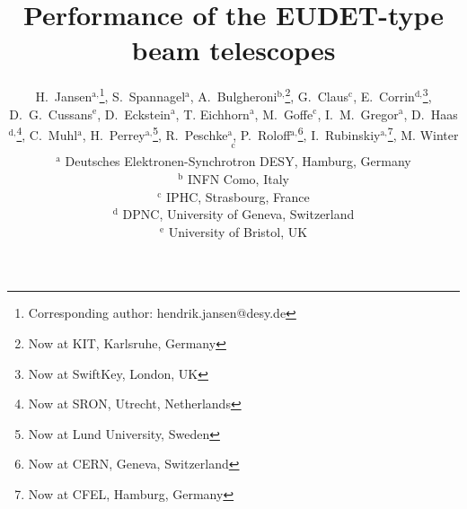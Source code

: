 \documentclass[a4paper,10pt]{article}
\makeatletter
\renewcommand{\maketitle}{\bgroup\setlength{\parindent}{0pt}
\begin{flushleft}
  \vspace*{10mm}
  \textbf{\huge\sffamily\@title}
  \vspace{5mm}
   
  \large \@author
\end{flushleft}\egroup
}
\makeatother
\begin{document}
\linenumbers








\title{Performance of the EUDET-type\\ beam telescopes}
\author{
H.~Jansen${}^{\textrm{a,}}$\footnote[*]{Corresponding author: hendrik.jansen@desy.de},
S.~Spannagel${}^{\textrm{a}}$, 
A.~Bulgheroni${}^{\textrm{b,}}$\footnote{Now at KIT, Karlsruhe, Germany},
G.~Claus${}^{\textrm{c}}$,
E.~Corrin${}^{\textrm{d,}}$\footnote{Now at SwiftKey, London, UK},
D.~G.~Cussans${}^{\textrm{e}}$,
D.~Eckstein${}^{\textrm{a}}$, 
T. Eichhorn${}^{\textrm{a}}$, 
M.~Goffe${}^{\textrm{c}}$,
I.~M.~Gregor${}^{\textrm{a}}$, 
D.~Haas${}^{\textrm{d,}}$\footnote{Now at SRON, Utrecht, Netherlands},
C.~Muhl${}^{\textrm{a}}$,
H.~Perrey${}^{\textrm{a,}}$\footnote{Now at Lund University, Sweden}, 
R.~Peschke${}^{\textrm{a}}$, 
P.~Roloff${}^{\textrm{a,}}$\footnote{Now at CERN, Geneva, Switzerland}, 
I.~Rubinskiy${}^{\textrm{a,}}$\footnote{Now at CFEL, Hamburg, Germany}, 
M. Winter${}^{\textrm{c}}$\\
\vspace{3mm}
${}^{\textrm{a}}$ Deutsches Elektronen-Synchrotron DESY, Hamburg, Germany\\
${}^{\textrm{b}}$ INFN Como, Italy\\
${}^{\textrm{c}}$ IPHC, Strasbourg, France\\
${}^{\textrm{d}}$ DPNC, University of Geneva, Switzerland\\
${}^{\textrm{e}}$ University of Bristol, UK
}
\maketitle
\end{document}
